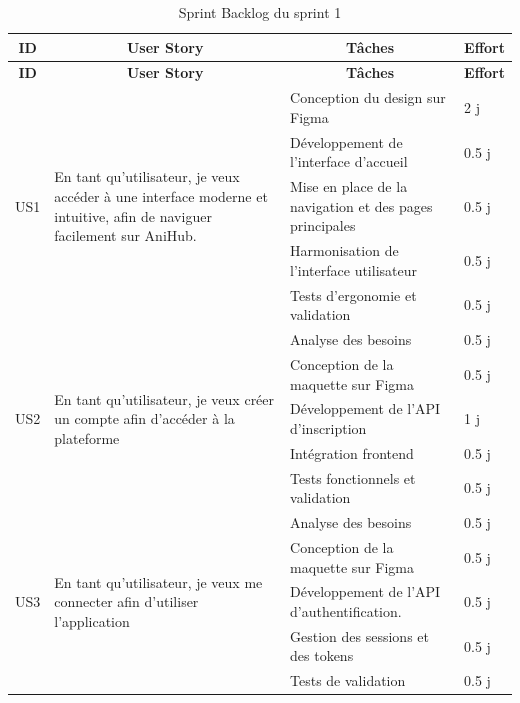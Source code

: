 \begin{longtable}{|p{1cm}|p{4.7cm}|p{7cm}|p{1.3cm}|}

\caption{Sprint Backlog du sprint 1}
\label{tab:sprint1-backlog} \\

\hline
\multicolumn{1}{|c|}{\cellcolor{coloranihub}\textbf{ID}} &
\multicolumn{1}{c|}{\cellcolor{coloranihub}\textbf{User Story}} &
\multicolumn{1}{c|}{\cellcolor{coloranihub}\textbf{Tâches}} &
\multicolumn{1}{c|}{\cellcolor{coloranihub}\textbf{Effort}} \\
\hline
\endfirsthead

\hline
\multicolumn{1}{|c|}{\cellcolor{coloranihub}\textbf{ID}} &
\multicolumn{1}{c|}{\cellcolor{coloranihub}\textbf{User Story}} &
\multicolumn{1}{c|}{\cellcolor{coloranihub}\textbf{Tâches}} &
\multicolumn{1}{c|}{\cellcolor{coloranihub}\textbf{Effort}} \\
\hline
\endhead

\multirow{5}{2cm}{US1}
& \multirow{5}{5cm}{En tant qu’utilisateur, je veux accéder à une interface moderne et intuitive, afin de naviguer facilement sur AniHub.}
& Conception du design sur Figma & 2 j \\
\cline{3-4}
& & Développement de l’interface d’accueil & 0.5 j \\
\cline{3-4}
& & Mise en place de la navigation et des pages principales & 0.5 j \\
\cline{3-4}
& & Harmonisation de l’interface utilisateur & 0.5 j \\
\cline{3-4}
& & Tests d’ergonomie et validation & 0.5 j \\
\hline

\multirow{5}{2cm}{US2}
& \multirow{5}{5cm}{En tant qu’utilisateur, je veux créer un compte afin d’accéder à la plateforme}
& Analyse des besoins & 0.5 j \\
\cline{3-4}
& & Conception de la maquette sur Figma& 0.5 j \\
\cline{3-4}
& & Développement de l’API d’inscription & 1 j \\
\cline{3-4}
& & Intégration frontend & 0.5 j \\
\cline{3-4}
& & Tests fonctionnels et validation & 0.5 j \\
\hline

\multirow{5}{2cm}{US3}
& \multirow{5}{5cm}{En tant qu’utilisateur, je veux me connecter afin d’utiliser l’application}
& Analyse des besoins & 0.5 j \\
\cline{3-4}
& & Conception de la maquette sur Figma & 0.5 j \\
\cline{3-4}
& & Développement de l’API d’authentification. & 0.5 j \\
\cline{3-4}
& & Gestion des sessions et des tokens & 0.5 j \\
\cline{3-4}
& & Tests de validation & 0.5 j \\
\hline


\end{longtable}
